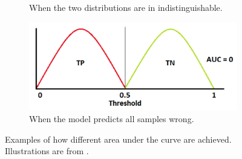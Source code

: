 \begin{figure}[H]
\begin{subfigure}{0.48\linewidth}
		\caption{When the two distributions are in indistinguishable.}
	\end{subfigure}
	\hfill
	\begin{subfigure}{0.48\linewidth}
		\vspace{0.8cm}
		\includegraphics[width=\linewidth]{Materials/Theory/ROC4}
		\caption{When the model predicts all samples wrong.}
	\end{subfigure}
	\caption{Examples of how different area under the curve are achieved. Illustrations are from \cite{ROC}.}
	\label{ROC}
\end{figure}
